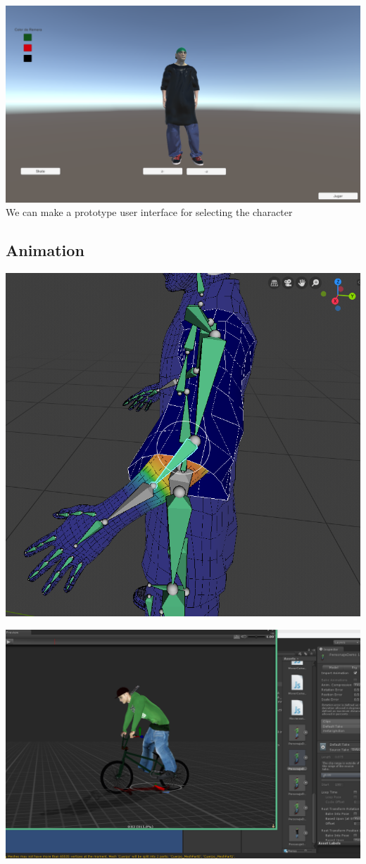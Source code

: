 \documentclass{article}
\begin{document}
  \includegraphics[width=\textwidth]{22.png}
  We can make a prototype user interface for selecting the character

  \subsection{Animation}
  \includegraphics[width=\textwidth]{30.png}

  \includegraphics[width=\textwidth]{28.png}
\end{document}
